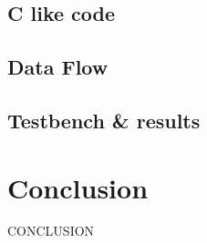\documentclass[9pt,a4paper,twoside]{tau}
\begin{document}
    \subsection{C like code}

    \subsection{Data Flow}

    \subsection{Testbench \& results}


     
\section{Conclusion}
\justifying

CONCLUSION



\printbibliography

\end{document}
